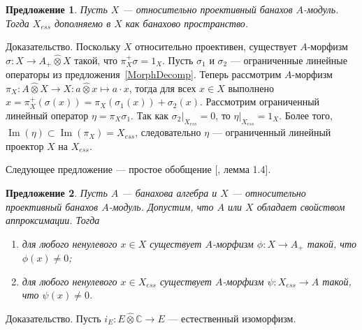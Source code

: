 \documentclass[12pt]{article}
\numberwithin{equation}{subsection}
\theoremstyle{plain}
\newtheorem{proposition}{Предложение}
\newenvironment{proof}{Доказательство.}{}
\newcommand{\projtens}{\mathbin{\widehat{\otimes}}}
\begin{document}
\begin{fulltext}
    \begin{proposition}\label{ProjModEssPartCompl} Пусть $X$ --- относительно
        проективный банахов $A$-модуль. Тогда $X_{ess}$ дополняемо в $X$ как
        банахово пространство.
    \end{proposition}
    \begin{proof} Поскольку $X$ относительно проективен, существует $A$-морфизм
        $\sigma:X\to A_+\projtens X$ такой, что $\pi_X^+\sigma=1_X$. Пусть
        $\sigma_1$ и $\sigma_2$ --- ограниченные линейные операторы из
        предложения~\ref{MorphDecomp}. Теперь рассмотрим $A$-морфизм
        $\pi_X:A\projtens X\to X:a\projtens x\mapsto a\cdot x$, тогда для всех
        $x\in X$ выполнено $x=\pi_X^+(\sigma(x))=\pi_X(\sigma_1(x)) +
            \sigma_2(x)$. Рассмотрим ограниченный линейный оператор $\eta =
            \pi_X\sigma_1$. Так как $\sigma_2|_{X_{ess}}=0$, то
        $\eta|_{X_{ess}}=1_X$. Более того,
        $\operatorname{Im}(\eta)\subset\operatorname{Im}(\pi_X)=X_{ess}$,
        следовательно $\eta$ --- ограниченный линейный проектор $X$ на
        $X_{ess}$.
    \end{proof}

    Следующее предложение --- простое обобщение [\cite{SelivBiprojBanAlg}, лемма
    1.4].

    \begin{proposition}\label{RelProjNecesCond} Пусть $A$ --- банахова алгебра и
        $X$ --- относительно проективный банахов $A$-модуль. Допустим, что $A$
        или $X$ обладает свойством аппроксимации. Тогда
        \begin{enumerate}[label = (\roman*)]
            \item для любого ненулевого $x\in X$ существует $A$-морфизм
                  $\phi:X\to A_+$ такой, что $\phi(x)\neq 0$;

            \item для любого ненулевого $x\in X_{ess}$ существует $A$-морфизм
                  $\psi:X_{ess}\to A$ такой, что $\psi(x)\neq 0$.
        \end{enumerate}

    \end{proposition}
    \begin{proof} Пусть $i_E:E\projtens \mathbb{C}\to E$ --- естественный
        изоморфизм.


\end{proof}
\end{fulltext}
\end{document}
